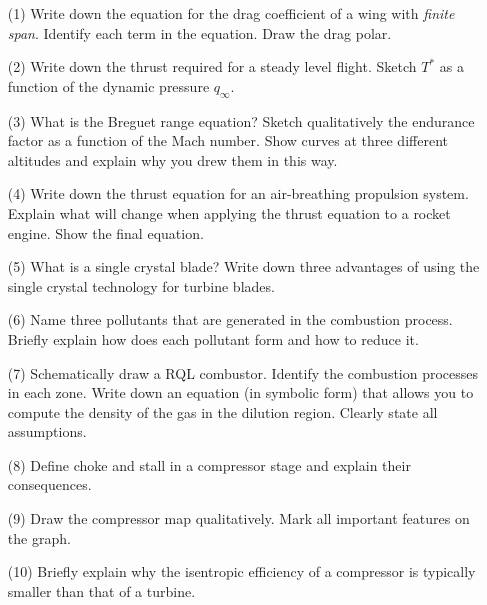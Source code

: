 \documentclass[11pt]{article}
\begin{document}
\begin{itemize}
	\item[(1)] Write down the equation for the drag coefficient of a wing with \emph{finite span}. Identify each term in the equation. Draw the drag polar.
	
	\item[(2)] Write down the thrust required for a steady level flight. Sketch $T^*$ as a function of the dynamic pressure $q_\infty$. 
	
	\item[(3)] What is the Breguet range equation? Sketch qualitatively the endurance factor as a function of the Mach number. Show curves at three different altitudes and explain why you drew them in this way.
	
	\item[(4)] Write down the thrust equation for an air-breathing propulsion system. Explain what will change when applying the thrust equation to a rocket engine. Show the final equation.
	
	\item[(5)] What is a single crystal blade? Write down three advantages of using the single crystal technology for turbine blades.
	
	\item[(6)] Name three pollutants that are generated in the combustion process. Briefly explain how does each pollutant form and how to reduce it.
	
	\item[(7)] Schematically draw a RQL combustor. Identify the combustion processes in each zone. Write down an equation (in symbolic form) that allows you to compute the density of the gas in the dilution region. Clearly state all assumptions.
	
	\item[(8)] Define choke and stall in a compressor stage and explain their consequences.
	
	\item[(9)] Draw the compressor map qualitatively. Mark all important features on the graph.
	
	\item[(10)] Briefly explain why the isentropic efficiency of a compressor is typically smaller than that of a turbine.
	
\end{itemize}


\newpage
\end{document}
